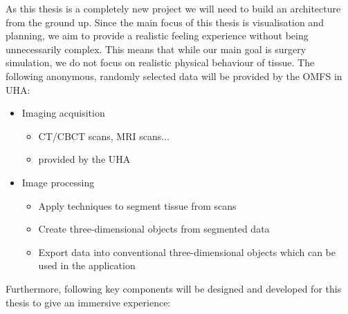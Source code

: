 As this thesis is a completely new project we will need to build an architecture from the ground up.
Since the main focus of this thesis is visualisation and planning, we aim to provide a realistic feeling experience without being unnecessarily complex.
This means that while our main goal is surgery simulation, we do not focus on realistic physical behaviour of tissue.
The following anonymous, randomly selected data will be provided by the OMFS in UHA:
\begin{itemize}
    \item Imaging acquisition
    \begin{itemize}
        \item CT/CBCT scans, MRI scans...
        \item provided by the UHA
    \end{itemize}
\item Image processing
    \begin{itemize}
        \item Apply techniques to segment tissue from scans
        \item Create three-dimensional objects from segmented data
        \item Export data into conventional three-dimensional objects which can be used in the application
    \end{itemize}
\end{itemize}

Furthermore, following key components will be designed and developed for this thesis to give an immersive experience:

